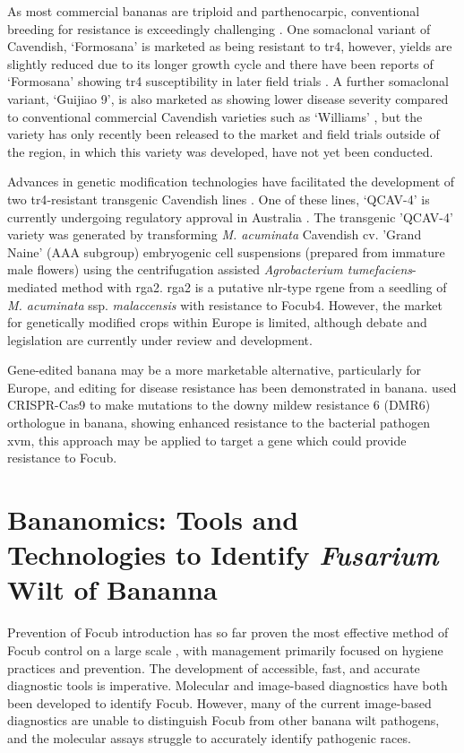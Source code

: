 As most commercial bananas are triploid and parthenocarpic, conventional breeding for resistance is exceedingly challenging \parencite{Dale2017}. One somaclonal variant of Cavendish, ‘Formosana’ is marketed as being resistant to \ac{tr4}, however, yields are slightly reduced due to its longer growth cycle and there have been reports of  ‘Formosana’ showing \ac{tr4} susceptibility in later field trials \parencite{Lee2011, Dale2017}. A further somaclonal variant, ‘Guijiao 9’, is also marketed as showing lower disease severity compared to conventional commercial Cavendish varieties such as ‘Williams’ \parencite{Sun2019}, but the variety has only recently been released to the market and field trials outside of the region, in which this variety was developed, have not yet been conducted.  

Advances in genetic modification technologies have facilitated the development of two \ac{tr4}-resistant transgenic Cavendish lines \parencite{Dale2017}. One of these lines, ‘QCAV-4’ is currently undergoing regulatory approval in Australia \parencite{Lu2023}. The transgenic 'QCAV-4' variety was generated by transforming \textit{M. acuminata }Cavendish cv. 'Grand Naine' (AAA subgroup) embryogenic cell suspensions (prepared from immature male flowers) using the centrifugation assisted \textit{Agrobacterium tumefaciens}-mediated method with \ac{rga2}. \ac{rga2} is a putative \ac{nlr}-type \ac{rgene} from a seedling of \textit{M. acuminata} ssp. \textit{malaccensis} with resistance to \ac{Focub4}. However, the market for genetically modified crops within Europe is limited, although debate and legislation are currently under review and development. 

Gene-edited banana may be a more marketable alternative, particularly for Europe, and editing for disease resistance has been demonstrated in banana. \textcite{Tripathi2021} used CRISPR-Cas9 to make mutations to the downy mildew resistance 6 (DMR6) orthologue in banana, showing enhanced resistance to the bacterial pathogen \ac{xvm}, this approach may be applied to target a gene which could provide resistance to \ac{Focub}.  

\section{Bananomics: Tools and Technologies to Identify \textit{Fusarium} Wilt of Bananna}
\label{sec:chap1-diagnostics}

Prevention of \ac{Focub} introduction has so far proven the most effective method of \ac{Focub} control on a large scale \parencite{Ploetz2015b}, with management primarily focused on hygiene practices and prevention. The development of accessible, fast, and accurate diagnostic tools is imperative. Molecular and image-based diagnostics have both been developed to identify \ac{Focub}. However, many of the current image-based diagnostics are unable to distinguish \ac{Focub} from other banana wilt pathogens, and the molecular assays struggle to accurately identify pathogenic races.  

